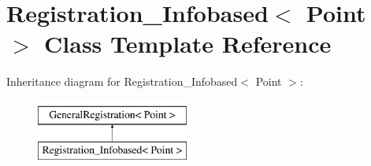 \hypertarget{classRegistration__Infobased}{
\section{Registration\_\-Infobased$<$ Point $>$ Class Template Reference}
\label{classRegistration__Infobased}
}
Inheritance diagram for Registration\_\-Infobased$<$ Point $>$:\begin{figure}[H]
\begin{center}
\leavevmode
\includegraphics[height=2.000000cm]{classRegistration__Infobased}
\end{center}
\end{figure}
